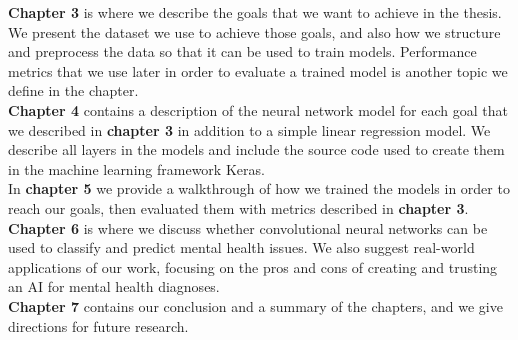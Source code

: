 \noindent \textbf{Chapter 3} is where we describe the goals that we want to achieve in the thesis. We present the dataset we use to achieve those goals, and also how we structure and preprocess the data so that it can be used to train models. Performance metrics that we use later in order to evaluate a trained model is another topic we define in the chapter.\\

\noindent \textbf{Chapter 4} contains a description of the neural network model for each goal that we described in \textbf{chapter 3} in addition to a simple linear regression model. We describe all layers in the models and include the source code used to create them in the machine learning framework Keras. \\

\noindent In \textbf{chapter 5} we provide a walkthrough of how we trained the models in order to reach our goals, then evaluated them with metrics described in \textbf{chapter 3}. \\

\noindent \textbf{Chapter 6} is where we discuss whether convolutional neural networks can be used to classify and predict mental health issues. We also suggest real-world applications of our work, focusing on the pros and cons of creating and trusting an AI for mental health diagnoses. \\

\noindent \textbf{Chapter 7} contains our conclusion and a summary of the chapters, and we give directions for future research.